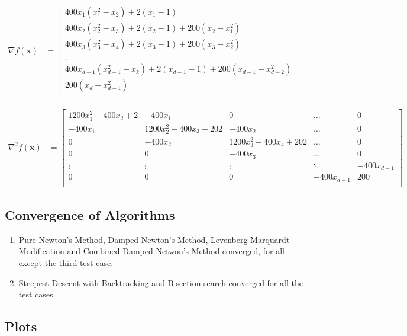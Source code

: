 \documentclass[a4paper]{article}
\begin{document}
\begin{align*}
\nabla f(\textbf{x}) &=
    \begin{bmatrix}
        400 x_1 (x_1^2 - x_2) + 2 (x_1 - 1) \\
        400 x_2 (x_2^2 - x_3) + 2 (x_2 - 1) + 200 (x_2 - x_1^2) \\
        400 x_3 (x_3^2 - x_4) + 2 (x_3 - 1) + 200 (x_3 - x_2^2) \\
        \vdots \\
        400 x_{d-1} (x_{d-1}^2 - x_k) + 2 (x_{d-1} - 1) + 200 (x_{d-1} - x_{d-2}^2) \\
        200 (x_d - x_{d-1}^2) \\
    \end{bmatrix}
\end{align*}

\begin{align*}
\nabla^2 f(\textbf{x}) &=
    \begin{bmatrix}
        1200 x_1^2 - 400 x_2 + 2 & -400 x_1 & 0 & \dots & 0 \\
        -400 x_1 & 1200 x_2^2 - 400 x_3 + 202 & -400 x_2 & \dots & 0 \\
        0 & -400 x_2 & 1200 x_3^2 - 400 x_4 + 202 & \dots & 0 \\
        0 & 0 & -400 x_3 & \dots & 0 \\
        \vdots & \vdots & \vdots & \ddots & -400 x_{d-1} \\
        0 & 0 & 0 & -400 x_{d-1} & 200 \\
    \end{bmatrix}
\end{align*}

\subsection{Convergence of Algorithms}

\begin{enumerate}

\item Pure Newton's Method, Damped Newton's Method, Levenberg-Marquardt Modification and Combined Damped Netwon's Method converged, for all except the third test case.

\item Steepest Descent with Backtracking and Bisection search converged for all the test cases.

\end{enumerate}

\subsection{Plots}
\end{document}
